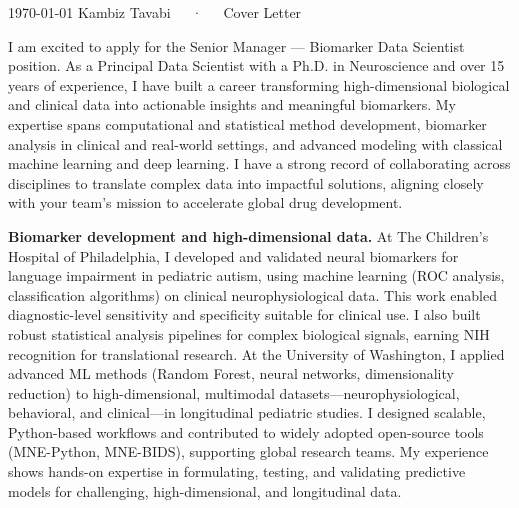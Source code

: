 \documentclass[10.5pt, letterpaper]{russell}
\begin{document}
\makecvheader[R]

\makecvfooter
{\today}
{Kambiz Tavabi~~~·~~~Cover Letter}
{\thepage}

\makelettertitle

\begin{cvletter}
  I am excited to apply for the Senior Manager — Biomarker Data Scientist position. As a Principal Data Scientist with a Ph.D. in Neuroscience and over 15 years of experience, I have built a career transforming high-dimensional biological and clinical data into actionable insights and meaningful biomarkers. My expertise spans computational and statistical method development, biomarker analysis in clinical and real-world settings, and advanced modeling with classical machine learning and deep learning. I have a strong record of collaborating across disciplines to translate complex data into impactful solutions, aligning closely with your team’s mission to accelerate global drug development.


  \textbf{Biomarker development and high-dimensional data.} At The Children’s Hospital of Philadelphia, I developed and validated neural biomarkers for language impairment in pediatric autism, using machine learning (ROC analysis, classification algorithms) on clinical neurophysiological data. This work enabled diagnostic-level sensitivity and specificity suitable for clinical use. I also built robust statistical analysis pipelines for complex biological signals, earning NIH recognition for translational research. At the University of Washington, I applied advanced ML methods (Random Forest, neural networks, dimensionality reduction) to high-dimensional, multimodal datasets—neurophysiological, behavioral, and clinical—in longitudinal pediatric studies. I designed scalable, Python-based workflows and contributed to widely adopted open-source tools (MNE-Python, MNE-BIDS), supporting global research teams. My experience shows hands-on expertise in formulating, testing, and validating predictive models for challenging, high-dimensional, and longitudinal data.


\end{cvletter}
\end{document}

